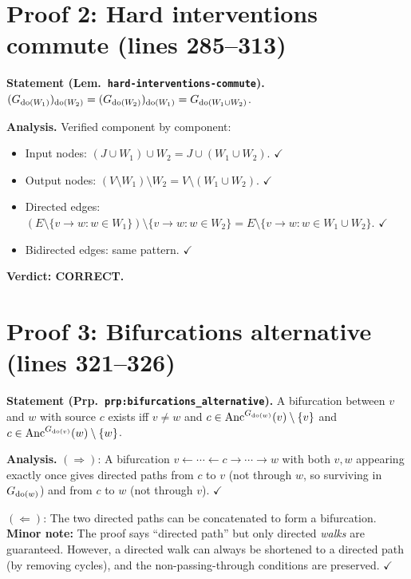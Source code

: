 \documentclass{article}
\begin{document}
\section{Proof 2: Hard interventions commute (lines 285--313)}

\textbf{Statement (Lem.\ \texttt{hard-interventions-commute}).}
$(G_{\operatorname{do}(W_1)})_{\operatorname{do}(W_2)} = (G_{\operatorname{do}(W_2)})_{\operatorname{do}(W_1)} = G_{\operatorname{do}(W_1\cup W_2)}$.

\textbf{Analysis.}
Verified component by component:
\begin{itemize}
  \item Input nodes: $(J\cup W_1)\cup W_2 = J\cup(W_1\cup W_2)$.  $\checkmark$
  \item Output nodes: $(V\setminus W_1)\setminus W_2 = V\setminus(W_1\cup W_2)$.  $\checkmark$
  \item Directed edges: $(E\setminus\{v\to w:w\in W_1\})\setminus\{v\to w:w\in W_2\}
    = E\setminus\{v\to w:w\in W_1\cup W_2\}$.  $\checkmark$
  \item Bidirected edges: same pattern.  $\checkmark$
\end{itemize}

\textbf{Verdict: CORRECT.}

\section{Proof 3: Bifurcations alternative (lines 321--326)}

\textbf{Statement (Prp.\ \texttt{prp:bifurcations\_alternative}).}
A bifurcation between $v$ and $w$ with source $c$ exists iff $v\ne w$ and
$c\in\mathrm{Anc}^{G_{\operatorname{do}(w)}}(v)\setminus\{v\}$ and $c\in\mathrm{Anc}^{G_{\operatorname{do}(v)}}(w)\setminus\{w\}$.

\textbf{Analysis.}
$(\Rightarrow)$: A bifurcation $v\leftarrow\cdots\leftarrow c\to\cdots\to w$
with both $v,w$ appearing exactly once gives directed paths from $c$ to $v$ (not
through $w$, so surviving in $G_{\operatorname{do}(w)}$) and from $c$ to $w$ (not through $v$).
$\checkmark$

$(\Leftarrow)$: The two directed paths can be concatenated to form a bifurcation.
\textbf{Minor note:} The proof says ``directed path'' but only directed \emph{walks} are
guaranteed.  However, a directed walk can always be shortened to a directed path
(by removing cycles), and the non-passing-through conditions are preserved.
$\checkmark$
\end{document}
